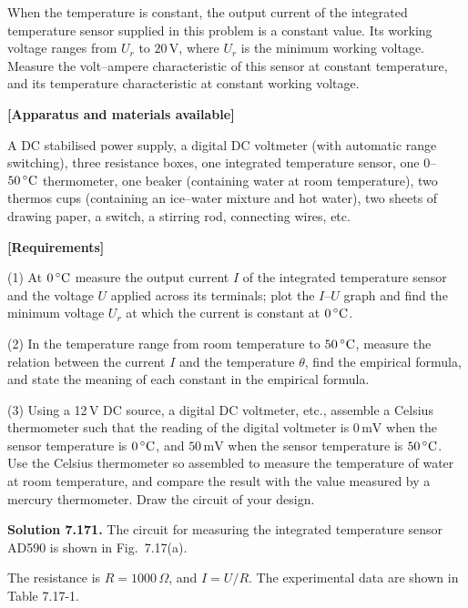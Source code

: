 When the temperature is constant, the output current of the integrated temperature sensor supplied in this problem is a constant value. Its working voltage ranges from $U_r$ to $20\,\mathrm{V}$, where $U_r$ is the minimum working voltage. Measure the volt--ampere characteristic of this sensor at constant temperature, and its temperature characteristic at constant working voltage.

\textbf{[Apparatus and materials available]}

A DC stabilised power supply, a digital DC voltmeter (with automatic range switching), three resistance boxes, one integrated temperature sensor, one $0$--$50\,^{\circ}\mathrm{C}$ thermometer, one beaker (containing water at room temperature), two thermos cups (containing an ice--water mixture and hot water), two sheets of drawing paper, a switch, a stirring rod, connecting wires, etc.

\textbf{[Requirements]}

(1) At $0\,^{\circ}\mathrm{C}$ measure the output current $I$ of the integrated temperature sensor and the voltage $U$ applied across its terminals; plot the $I$--$U$ graph and find the minimum voltage $U_r$ at which the current is constant at $0\,^{\circ}\mathrm{C}$.

(2) In the temperature range from room temperature to $50\,^{\circ}\mathrm{C}$, measure the relation between the current $I$ and the temperature $\theta$, find the empirical formula, and state the meaning of each constant in the empirical formula.

(3) Using a 12\,V DC source, a digital DC voltmeter, etc., assemble a Celsius thermometer such that the reading of the digital voltmeter is $0\,\mathrm{mV}$ when the sensor temperature is $0\,^{\circ}\mathrm{C}$, and $50\,\mathrm{mV}$ when the sensor temperature is $50\,^{\circ}\mathrm{C}$. Use the Celsius thermometer so assembled to measure the temperature of water at room temperature, and compare the result with the value measured by a mercury thermometer. Draw the circuit of your design.

\textbf{Solution 7.17}\quad \textbf{1.} The circuit for measuring the integrated temperature sensor AD590 is shown in Fig.~7.17(a).

The resistance is $R=1000\,\Omega$, and $I=U/R$. The experimental data are shown in Table 7.17-1.

